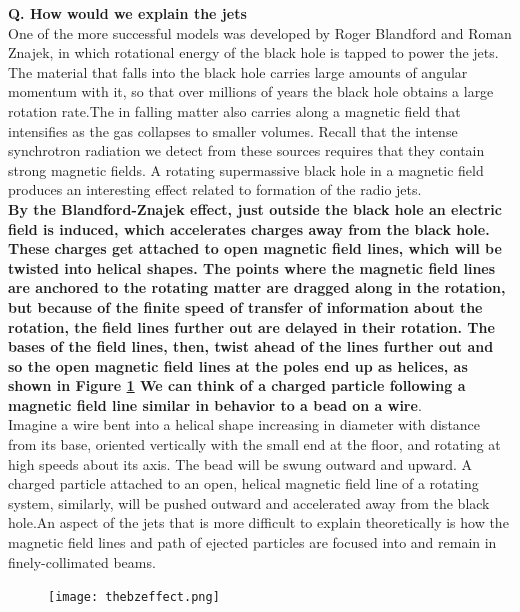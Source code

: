 \documentclass[10pt]{report}
\newcommand{\tbf}[1]{\textbf{#1}}
\begin{document}
 \tbf{Q. How would we explain the jets}\\ 
   One of the more successful models was developed by Roger Blandford and Roman Znajek, in which rotational energy of the black hole is tapped to power the jets. The material that falls into the black hole carries large amounts of angular momentum with it, so that over millions of years the black hole obtains a large rotation rate.The in falling matter also carries along a magnetic field that intensifies as the gas collapses to smaller volumes. Recall that the intense synchrotron radiation we detect from these sources requires that they contain strong magnetic fields. A rotating supermassive black hole in a magnetic field produces an interesting effect related to formation of the radio jets.\\
    \tbf{ By the Blandford-Znajek effect, just outside the black hole an electric field is induced, which accelerates charges away from the black hole. These charges get attached to open magnetic field lines, which will be twisted into helical shapes. The points where the magnetic field lines are anchored to the rotating matter are dragged along in the rotation, but because of the finite speed of transfer of information about the rotation, the field lines further out are delayed in their rotation. The bases of the field lines, then, twist ahead of the lines further out and so the open magnetic field lines at the poles end up as helices, as shown in Figure \ref{bzeffect} We can think of a charged particle following a magnetic field line similar in behavior to a bead on a wire}.\\
    
     Imagine a wire bent into a helical shape increasing in diameter with distance from its base, oriented vertically with the small end at the floor, and rotating at high speeds about its axis. The bead will be swung outward and upward. A charged particle attached to an open, helical magnetic field line of a rotating system, similarly, will be pushed outward and accelerated away from the black hole.An aspect of the jets that is more difficult to explain theoretically is how the magnetic field lines and path of ejected particles are focused into and remain in finely-collimated beams. 
   \begin{figure}\label{bzeffect}
   \texttt{[image: thebzeffect.png]}
   \end{figure}
\end{document}
